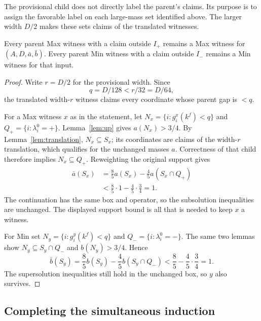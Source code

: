 The provisional child does not directly label the parent's claims.
Its purpose is to assign the favorable label on each large-mass set
identified above. The larger width $D/2$ makes these sets claims of
the translated witnesses.

\begin{lemma}
\label{lem:reweight}
Every parent Max witness with a claim outside $I_+$ remains a Max
witness for $(A,D,\bar a,\bar b)$. Every parent Min witness with
a claim outside $I_-$ remains a Min witness for that input.
\end{lemma}

\begin{proof}
Write $r=D/2$ for the provisional width. Since
\[
                         q=D/128<r/32=D/64,
\]
the translated width-$r$ witness claims every coordinate whose parent
gap is $<q$.

For a Max witness $x$ as in the statement, let
$N_x=\{i:g_i^x(k^f)<q\}$ and
$Q_+=\{i:\lambda_i^0=+\}$. Lemma~\ref{lem:up} gives
$a(N_x)>3/4$. By Lemma~\ref{lem:translation}, $N_x\subseteq S_x$;
its coordinates are claims of the width-$r$ translation, which
qualifies for the unchanged masses $a$. Correctness of that child
therefore implies $N_x\subseteq Q_+$. Reweighting the original
support gives
\begin{align*}
 \bar a(S_x)
   &=\frac85 a(S_x)-\frac45 a(S_x\cap Q_+)\\
   &<\frac85\cdot1-\frac45\cdot\frac34=1.
\end{align*}
The continuation has the same box and operator, so the subsolution
inequalities are unchanged. The displayed support bound is all that
is needed to keep $x$ a witness.

For Min set $N_y=\{i:g_i^y(k^f)<q\}$ and
$Q_-=\{i:\lambda_i^0=-\}$. The same two lemmas show
$N_y\subseteq S_y\cap Q_-$ and $b(N_y)>3/4$. Hence
\[
 \bar b(S_y)=\frac85 b(S_y)-\frac45 b(S_y\cap Q_-)
                         <\frac85-\frac45\cdot\frac34=1.
\]
The supersolution inequalities still hold in the unchanged box,
so $y$ also survives.
\end{proof}

\subsection{Completing the simultaneous induction}

